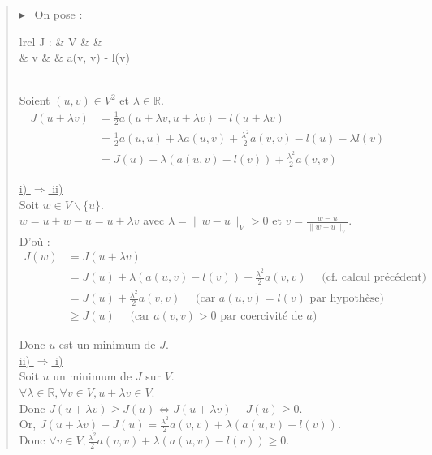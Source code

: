 \documentclass[12pt,a4paper]{article}
\newcommand{\preuve}[1]{%
    \begin{quote}
        $\blacktriangleright$~#1
    \end{quote}
}
\begin{document}
\preuve{
    On pose : \begin{array}[t]{lrcl}
        J : & V & \longrightarrow & \mathbb{R} \\
        & v & \longmapsto & \frac{1}{2} a(v, v) - l(v)
    \end{array} \\
    Soient $(u, v) \in V^2$ et $\lambda \in \mathbb{R}$. \\
    \begin{align*}
        J(u + \lambda v) & = \frac{1}{2} a(u + \lambda v, u + \lambda v) - l(u + \lambda v) \\
        & = \frac{1}{2} a(u, u) + \lambda a(u, v) + \frac{\lambda^2}{2} a(v, v) - l(u) - \lambda l(v) \\
        & = J(u) + \lambda (a(u, v) - l(v)) + \frac{\lambda^2}{2} a(v, v)
    \end{align*}

    \underline{i) $\Rightarrow$ ii)} \\
    Soit $w \in V\backslash \{u\}$. \\
    $w = u + w - u = u + \lambda v$ avec $\lambda = \| w - u \|_V > 0$ et $v = \frac{w - u}{\| w - u \|_V}$. \\

    D'où : 
    \begin{align*}
        J(w) &= J(u + \lambda v) \\
        &= J(u) + \lambda (a(u, v) - l(v)) + \frac{\lambda^2}{2} a(v, v) \quad \text{ (cf. calcul précédent)} \\
        &= J(u) + \frac{\lambda^2}{2} a(v, v) \quad \text{ (car } a(u, v) = l(v) \text{ par hypothèse)} \\
        &\geq J(u) \quad \text{ (car } a(v, v) > 0 \text{ par coercivité de } a)
    \end{align*}

    Donc $u$ est un minimum de $J$. \\

    \underline{ii) $\Rightarrow$ i)} \\
    Soit $u$ un minimum de $J$ sur $V$. \\
    $\forall \lambda \in \mathbb{R}, \forall v \in V, u + \lambda v \in V$. \\
    Donc $J(u + \lambda v) \geq J(u) \Leftrightarrow J(u + \lambda v) - J(u) \geq 0$. \\

    Or, $J(u + \lambda v) - J(u) = \frac{\lambda^2}{2} a(v, v) + \lambda (a(u, v) - l(v))$. \\
    Donc $\forall v \in V, \frac{\lambda^2}{2} a(v, v) + \lambda (a(u, v) - l(v)) \geq 0$.

}
\end{document}
